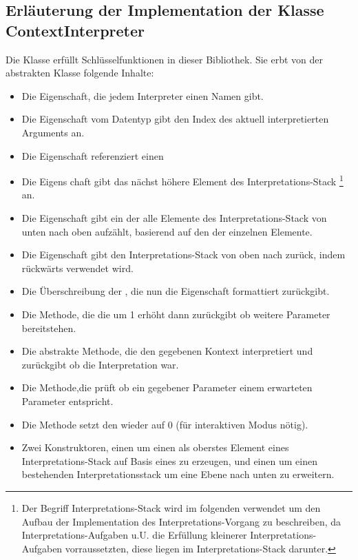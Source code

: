  \subsection{Erläuterung der Implementation der Klasse ContextInterpreter}\label{subsec:ContextInterpreter}
 Die Klasse  erfüllt Schl\"usselfunktionen in dieser Bibliothek.
 Sie erbt von der abstrakten  Klasse folgende Inhalte:
 \begin{itemize}
  \item Die  Eigenschaft, die jedem Interpreter einen Namen gibt.
  \item Die  Eigenschaft vom Datentyp  gibt den Index des aktuell interpretierten Arguments an.
  \item Die  Eigenschaft referenziert einen 
  \item Die  Eigens chaft gibt das nächst höhere Element des Interpretations-Stack
   \footnote{Der Begriff Interpretations-Stack wird im folgenden verwendet um den Aufbau der Implementation des Interpretations-Vorgang zu beschreiben, da Interpretations-Aufgaben u.U. die Erfüllung kleinerer Interpretations-Aufgaben vorraussetzten, diese liegen im Interpretations-Stack darunter.}
   an.%
  \item Die  Eigenschaft gibt ein  der alle Elemente des Interpretations-Stack von unten nach oben aufz\"ahlt, basierend auf den  der einzelnen Elemente.
  \item Die  Eigenschaft gibt den Interpretations-Stack von oben nach zur\"uck, indem  r\"uckw\"arts verwendet wird.
  \item Die Überschreibung der , die nun die  Eigenschaft formattiert zur\"uckgibt.
  \item Die  Methode, die die  um 1 erh\"oht dann zur\"uckgibt ob weitere Parameter bereitstehen.
  \item Die abstrakte  Methode, die den gegebenen Kontext interpretiert und zur\"uckgibt ob die Interpretation war.
  \item Die  Methode,die pr\"uft ob ein gegebener Parameter einem erwarteten Parameter entspricht.
  \item Die  Methode setzt den  wieder auf 0 (f\"ur interaktiven Modus n\"otig).
  \item Zwei Konstruktoren, einen um einen  als oberstes Element eines Interpretations-Stack auf Basis eines  zu erzeugen, und einen um einen bestehenden Interpretationsstack um eine Ebene nach unten zu erweitern.
 \end{itemize}
